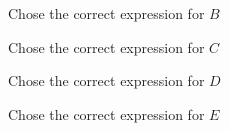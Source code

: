 \documentclass{ximera}
\begin{document}
\begin{exercise}
Chose the correct expression for $B$
\begin{multipleChoice}
\end{multipleChoice}

Chose the correct expression for $C$
\begin{multipleChoice}
\end{multipleChoice}

Chose the correct expression for $D$
\begin{multipleChoice}
\end{multipleChoice}

Chose the correct expression for $E$
\begin{multipleChoice}
\end{multipleChoice}

\end{exercise}
\end{document}
